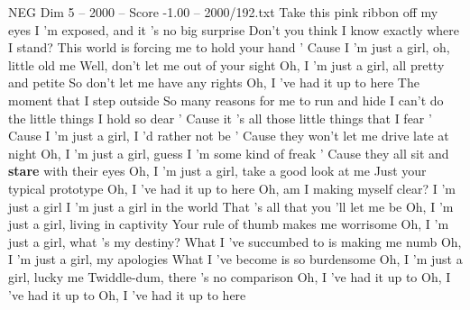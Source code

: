 \begin{textsample}{NEG Dim 5 – 2000 – Score -1.00 – 2000/192.txt}  \label{ex:f5_neg_036}
Take this pink ribbon off my eyes I 'm exposed, and it 's no big surprise Don't you think I know exactly where I stand?
This world is forcing me to hold your hand ' Cause I 'm just a girl, oh, little old me Well, don't let me out of your sight Oh, I 'm just a girl, all pretty and petite So don't let me have any rights Oh, I 've had it up to here The moment that I step outside So many reasons for me to run and hide I can't do the little things I hold so dear ' Cause it 's all those little things that I fear ' Cause I 'm just a girl, I 'd rather not be ' Cause they won't let me drive late at night Oh, I 'm just a girl, guess I 'm some kind of freak ' Cause they all sit and \textbf{stare} with their eyes Oh, I 'm just a girl, take a good look at me Just your typical prototype Oh, I 've had it up to here Oh, am I making myself clear?
I 'm just a girl I 'm just a girl in the world That 's all that you 'll let me be Oh, I 'm just a girl, living in captivity Your rule of thumb makes me worrisome Oh, I 'm just a girl, what 's my destiny?
What I 've succumbed to is making me numb Oh, I 'm just a girl, my apologies What I 've become is so burdensome Oh, I 'm just a girl, lucky me Twiddle-dum, there 's no comparison Oh, I 've had it up to Oh, I 've had it up to Oh, I 've had it up to here

\end{textsample}
